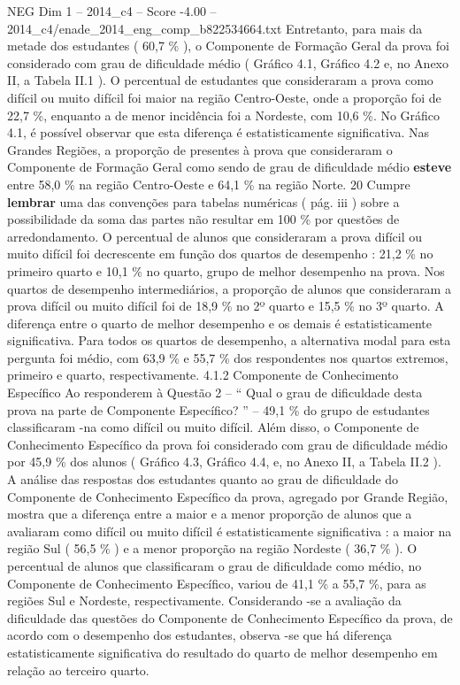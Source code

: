 \begin{textsample}{NEG Dim 1 – 2014\_c4 – Score -4.00 – 2014\_c4/enade\_2014\_eng\_comp\_b822534664.txt}
Entretanto, para mais da metade dos estudantes ( 60,7 \% ), o Componente de Formação Geral da prova foi considerado com grau de dificuldade médio ( Gráfico 4.1, Gráfico 4.2 e, no Anexo II, a Tabela II.1 ).
O percentual de estudantes que consideraram a prova como difícil ou muito difícil foi maior na região Centro-Oeste, onde a proporção foi de 22,7 \%, enquanto a de menor incidência foi a Nordeste, com 10,6 \%.
No Gráfico 4.1, é possível observar que esta diferença é estatisticamente significativa.
Nas Grandes Regiões, a proporção de presentes à prova que consideraram o Componente de Formação Geral como sendo de grau de dificuldade médio \textbf{esteve} entre 58,0 \% na região Centro-Oeste e 64,1 \% na região Norte. 20 Cumpre \textbf{lembrar} uma das convenções para tabelas numéricas ( pág. iii ) sobre a possibilidade da soma das partes não resultar em 100 \% por questões de arredondamento.
O percentual de alunos que consideraram a prova difícil ou muito difícil foi decrescente em função dos quartos de desempenho : 21,2 \% no primeiro quarto e 10,1 \% no quarto, grupo de melhor desempenho na prova.
Nos quartos de desempenho intermediários, a proporção de alunos que consideraram a prova difícil ou muito difícil foi de 18,9 \% no 2º quarto e 15,5 \% no 3º quarto.
A diferença entre o quarto de melhor desempenho e os demais é estatisticamente significativa.
Para todos os quartos de desempenho, a alternativa modal para esta pergunta foi médio, com 63,9 \% e 55,7 \% dos respondentes nos quartos extremos, primeiro e quarto, respectivamente. 4.1.2 Componente de Conhecimento Específico Ao responderem à Questão 2 – “ Qual o grau de dificuldade desta prova na parte de Componente Específico? ” – 49,1 \% do grupo de estudantes classificaram -na como difícil ou muito difícil.
Além disso, o Componente de Conhecimento Específico da prova foi considerado com grau de dificuldade médio por 45,9 \% dos alunos ( Gráfico 4.3, Gráfico 4.4, e, no Anexo II, a Tabela II.2 ).
A análise das respostas dos estudantes quanto ao grau de dificuldade do Componente de Conhecimento Específico da prova, agregado por Grande Região, mostra que a diferença entre a maior e a menor proporção de alunos que a avaliaram como difícil ou muito difícil é estatisticamente significativa : a maior na região Sul ( 56,5 \% ) e a menor proporção na região Nordeste ( 36,7 \% ).
O percentual de alunos que classificaram o grau de dificuldade como médio, no Componente de Conhecimento Específico, variou de 41,1 \% a 55,7 \%, para as regiões Sul e Nordeste, respectivamente.
Considerando -se a avaliação da dificuldade das questões do Componente de Conhecimento Específico da prova, de acordo com o desempenho dos estudantes, observa -se que há diferença estatisticamente significativa do resultado do quarto de melhor desempenho em relação ao terceiro quarto.

\end{textsample}
